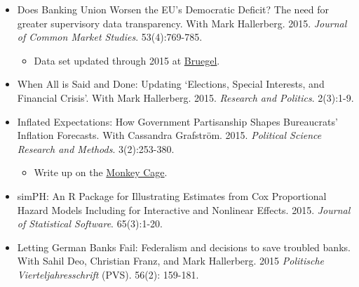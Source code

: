 \documentclass[a4paper]{article}
\begin{document}
{\begin{itemize}
\begin{itemize}
            \item Applied to understanding violence in the Ukrainian Parliament in \href{http://voxukraine.org/2015/12/24/causes-and-possible-solutions-to-brawling-in-the-ukrainian-parliament-en-2/}{VoxUkraine}.

            \item Write up on the \href{http://t.co/fETbFCXcYU}{Monkey Cage} with Emily Beaulieu.

        \end{itemize}

    \item Does Banking Union Worsen the EU's Democratic Deficit? The need for greater supervisory data transparency. With Mark Hallerberg. 2015. {\emph{Journal of Common Market Studies}}. 53(4):769-785.

        \begin{itemize}
            \item Data set updated through 2015 at \href{http://bruegel.org/2016/05/the-european-union-remains-a-laggard-on-banking-supervisory-transparency/}{Bruegel}.
        \end{itemize}

    \item When All is Said and Done: Updating `Elections, Special Interests, and Financial Crisis'. With Mark Hallerberg. 2015. \emph{Research and Politics}. 2(3):1-9.

    \item Inflated Expectations: How Government Partisanship Shapes Bureaucrats' Inflation Forecasts. With Cassandra Grafstr\"{o}m. 2015. {\emph{Political Science Research and Methods}}. 3(2):253-380.

    \begin{itemize}
        \item Write up on the \href{http://www.washingtonpost.com/blogs/monkey-cage/wp/2015/01/28/the-fed-cant-accurately-forecast-inflation-heres-why-this-may-hurt-democrats/}{Monkey Cage}.
    \end{itemize}

    \item simPH: An R Package for Illustrating Estimates from Cox Proportional Hazard Models Including for Interactive and Nonlinear Effects. 2015. {\emph{Journal of Statistical Software}}. 65(3):1-20.

    \item Letting German Banks Fail: Federalism and decisions to save troubled banks. With Sahil Deo, Christian Franz, and Mark Hallerberg. 2015 \emph{Politische Vierteljahresschrift} (PVS). 56(2): 159-181.


\end{itemize}}
\end{document}

